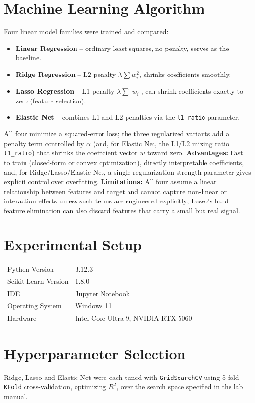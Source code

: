\documentclass[12pt,a4paper]{article}
\begin{document}
\section{Machine Learning Algorithm}
Four linear model families were trained and compared:
\begin{itemize}
\item \textbf{Linear Regression} -- ordinary least squares, no penalty, serves as the
baseline.
\item \textbf{Ridge Regression} -- L2 penalty $\lambda\sum w_i^2$, shrinks coefficients
smoothly.
\item \textbf{Lasso Regression} -- L1 penalty $\lambda\sum|w_i|$, can shrink coefficients
exactly to zero (feature selection).
\item \textbf{Elastic Net} -- combines L1 and L2 penalties via the \texttt{l1\_ratio}
parameter.
\end{itemize}
All four minimize a squared-error loss; the three regularized variants add a penalty term
controlled by $\alpha$ (and, for Elastic Net, the L1/L2 mixing ratio \texttt{l1\_ratio})
that shrinks the coefficient vector $w$ toward zero.
\textbf{Advantages:} Fast to train (closed-form or convex optimization), directly
interpretable coefficients, and, for Ridge/Lasso/Elastic Net, a single regularization
strength parameter gives explicit control over overfitting.
\textbf{Limitations:} All four assume a linear relationship between features and target
and cannot capture non-linear or interaction effects unless such terms are engineered
explicitly; Lasso's hard feature elimination can also discard features that carry a small
but real signal.

\section{Experimental Setup}
\begin{tabular}{ll}
\toprule
Python Version & 3.12.3 \\
Scikit-Learn Version & 1.8.0 \\
IDE & Jupyter Notebook \\
Operating System & Windows 11 \\
Hardware & Intel Core Ultra 9, NVIDIA RTX 5060 \\
\bottomrule
\end{tabular}

\section{Hyperparameter Selection}
Ridge, Lasso and Elastic Net were each tuned with \texttt{GridSearchCV} using 5-fold
\texttt{KFold} cross-validation, optimizing $R^2$, over the search space specified in the
lab manual.
\end{document}
